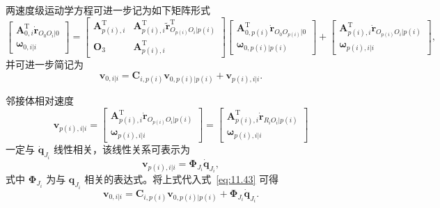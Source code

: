两速度级运动学方程可进一步记为如下矩阵形式
\begin{equation}\label{eq:11.42}
\begin{bmatrix}
\boldsymbol{A}_{0,i}^{\mathrm{T}} \dot{\boldsymbol{r}}_{O_0O_i|0} \\[4pt]
\boldsymbol{\omega}_{0,i|i}
\end{bmatrix}
=
\begin{bmatrix}
\boldsymbol{A}_{p(i),i}^{\mathrm{T}} & \boldsymbol{A}_{p(i),i}^{\mathrm{T}} \tilde{\boldsymbol{r}}_{O_{p(i)}O_i|p(i)}^{\mathrm{T}} \\[4pt]
\boldsymbol{O}_3 & \boldsymbol{A}_{p(i),i}^{\mathrm{T}}
\end{bmatrix}
\begin{bmatrix}
\boldsymbol{A}_{0,p(i)}^{\mathrm{T}} \dot{\boldsymbol{r}}_{O_0O_{p(i)}|0} \\[4pt]
\boldsymbol{\omega}_{0,p(i)|p(i)}
\end{bmatrix}
+
\begin{bmatrix}
\boldsymbol{A}_{p(i),i}^{\mathrm{T}} \dot{\boldsymbol{r}}_{O_{p(i)}O_i|p(i)} \\[4pt]
\boldsymbol{\omega}_{p(i),i|i}
\end{bmatrix},
\end{equation}
并可进一步简记为
\begin{equation}\label{eq:11.43}
\boldsymbol{v}_{0,i|i} = \boldsymbol{C}_{i,p(i)} \boldsymbol{v}_{0,p(i)|p(i)} + \boldsymbol{v}_{p(i),i|i}.
\end{equation}

邻接体相对速度
\begin{equation}\label{eq:11.44}
\boldsymbol{v}_{p(i),i|i} = \begin{bmatrix}
\boldsymbol{A}_{p(i),i}^{\mathrm{T}} \dot{\boldsymbol{r}}_{O_{p(i)}O_i|p(i)} \\[4pt]
\boldsymbol{\omega}_{p(i),i|i}
\end{bmatrix}
= \begin{bmatrix}
\boldsymbol{A}_{p(i),i}^{\mathrm{T}} \dot{\boldsymbol{r}}_{R_iO_i|p(i)} \\[4pt]
\boldsymbol{\omega}_{p(i),i|i}
\end{bmatrix}
\end{equation}
一定与 $\dot{\boldsymbol{q}}_{J_i}$ 线性相关，该线性关系可表示为
\begin{equation}\label{eq:11.45}
\boldsymbol{v}_{p(i),i|i} = \boldsymbol{\Phi}_{J_i} \dot{\boldsymbol{q}}_{J_i},
\end{equation}
式中 $\boldsymbol{\Phi}_{J_i}$ 为与 $\boldsymbol{q}_{J_i}$ 相关的表达式。将上式代入式~\eqref{eq:11.43} 可得
\begin{equation}\label{eq:11.46}
\boldsymbol{v}_{0,i|i} = \boldsymbol{C}_{i,p(i)} \boldsymbol{v}_{0,p(i)|p(i)} + \boldsymbol{\Phi}_{J_i} \dot{\boldsymbol{q}}_{J_i}.
\end{equation}

